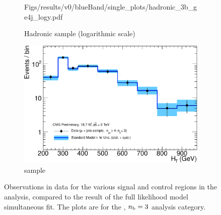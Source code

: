\begin{figure}[h!]
\begin{subfigure}[b]{0.48\textwidth}
    {Figs/results/v0/blueBand/single_plots/hadronic_3b_ge4j_logy.pdf}
    \caption{Hadronic sample (logarithmic scale)}
  \end{subfigure}
  \begin{subfigure}[b]{0.48\textwidth}
    \includegraphics[width=\textwidth]
    {Figs/results/v0/blueBand/single_plots/muon_3b_ge4j_logy.pdf}
    \caption{\mj sample}
  \end{subfigure}
  \caption{Observations in data for the various signal and control
  regions in the analysis, compared to the result of the full likelihood model
  simultaneous fit. The plots are for the \njhigh, $n_{\text{b}} = 3$ analysis category.}
  \label{fig:blue_fits_3b_ge4j}
\end{figure}

